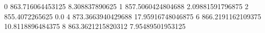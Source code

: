 0 863.716064453125 8.308837890625
1 857.5060424804688 2.09881591796875
2 855.4072265625 0.0
4 873.3663940429688 17.95916748046875
6 866.2191162109375 10.8118896484375
8 863.3621215820312 7.95489501953125

